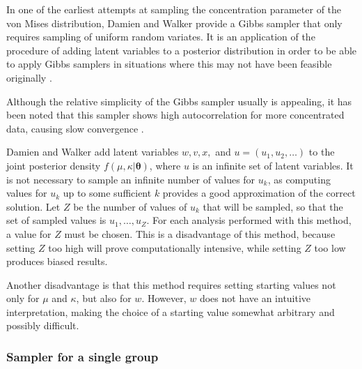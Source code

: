 \documentclass[]{gSCS2e}
\theoremstyle{plain}
\theoremstyle{definition}
\theoremstyle{remark}
\begin{document}
In one of the earliest attempts at sampling the concentration parameter of the von Mises distribution, Damien and Walker \cite{damien1999fullbayes} provide a Gibbs sampler that only requires sampling of uniform random variates. It is an application of the procedure of adding latent variables to a posterior distribution in order to be able to apply Gibbs samplers in situations where this may not have been feasible originally \citep{damlen1999auxiliary}. 

Although the relative simplicity of the Gibbs sampler usually is appealing, it has been noted that this sampler shows high autocorrelation for more concentrated data, causing slow convergence \citep[p. 990]{nunez2005bayesian}. %

Damien and Walker \cite{damien1999fullbayes} add latent variables $w, v, x,$ and $u=(u_1, u_2, \dots)$ to the joint posterior density $f(\mu, \kappa \vert \boldsymbol\theta)$, where $u$ is an infinite set of latent variables. It is not necessary to sample an infinite number of values for $u_k$, as computing values for $u_k$ up to some sufficient $k$ provides a good approximation of the correct solution. Let $Z$ be the number of values of $u_k$ that will be sampled, so that the set of sampled values is $u_1, \dots, u_Z$. For each analysis performed with this method, a value for $Z$ must be chosen. This is a disadvantage of this method, because setting $Z$ too high will prove computationally intensive, while setting $Z$ too low produces biased results. 

Another disadvantage is that this method requires setting starting values  not only for $\mu$ and $\kappa$, but also for $w$. However, $w$ does not have an intuitive interpretation, making the choice of a starting value somewhat arbitrary and possibly difficult. %

\subsubsection{Sampler for a single group}
\end{document}
